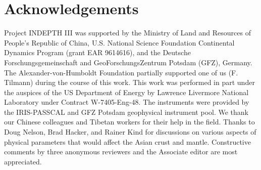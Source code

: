 \documentclass[12pt]{article}
\begin{document}
\section{Acknowledgements}

Project INDEPTH III was supported by the Ministry of Land and Resources of People's Republic of China, U.S.
National Science Foundation Continental Dynamics Program (grant EAR 9614616), and the Deutsche
Forschungsgemeinschaft and GeoForschungsZentrum Potsdam (GFZ), Germany.  The Alexander-von-Humboldt
Foundation partially supported one of us (F. Tilmann) during the course of this work.  This work was
performed in part under the auspices of the US Department of Energy by Lawrence Livermore National
Laboratory under Contract W-7405-Eng-48.  The instruments were provided by the IRIS-PASSCAL and GFZ Potsdam
geophysical instrument pool.  We thank our Chinese colleagues and Tibetan workers for their help in the
field.  Thanks to Doug Nelson, Brad Hacker, and Rainer Kind for discussions on various aspects of physical
parameters that would affect the Asian crust and mantle.  Constructive comments by three anonymous reviewers and the
Associate editor are most appreciated.
\end{document}
